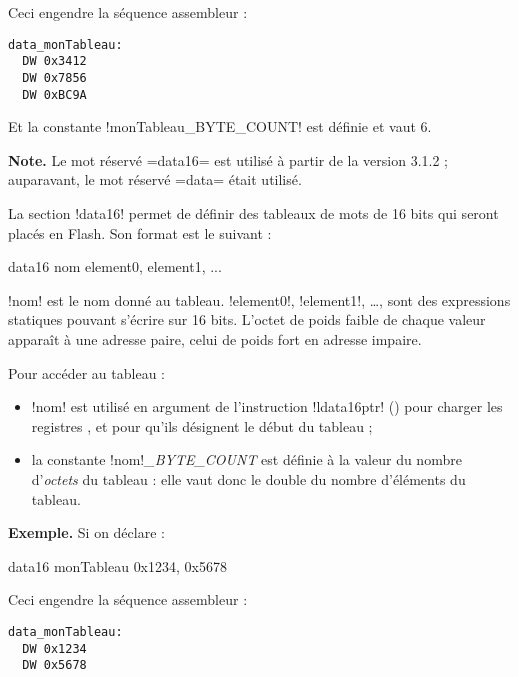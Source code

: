 Ceci engendre la séquence assembleur :

\begin{lstlisting}[language=assembleur]
data_monTableau:
  DW 0x3412
  DW 0x7856
  DW 0xBC9A
\end{lstlisting}

Et la constante \pic!monTableau_BYTE_COUNT! est définie et vaut 6.




{\bf Note.} Le mot réservé \pic=data16= est utilisé à partir de la version 3.1.2 ; auparavant, le mot réservé \pic=data= était utilisé.

La section \pic!data16! permet de définir des tableaux de mots de 16 bits qui seront placés en Flash. Son format est le suivant :

\begin{piccolo}
  data16 nom {element0, element1, ... }
\end{piccolo}

\pic!nom! est le nom donné au tableau. \pic!element0!, \pic!element1!, …, sont des expressions statiques pouvant s'écrire sur 16 bits. L'octet de poids faible de chaque valeur apparaît à une adresse paire, celui de poids fort en adresse impaire.

Pour accéder au tableau :
\begin{itemize}
  \item \pic!nom! est utilisé en argument de l'instruction \pic!ldata16ptr! () pour charger les registres ,  et  pour qu'ils désignent le début du tableau ;
  \item la constante \pic!nom!\emph{\small{\_BYTE\_COUNT}} est définie à la valeur du nombre d'\emph{octets} du tableau : elle vaut donc le double du nombre d'éléments du tableau.
\end{itemize}



\textbf{Exemple.} Si on déclare :
\begin{piccolo}
  data16 monTableau {0x1234, 0x5678}
\end{piccolo}

Ceci engendre la séquence assembleur :

\begin{lstlisting}[language=assembleur]
data_monTableau:
  DW 0x1234
  DW 0x5678
\end{lstlisting}

